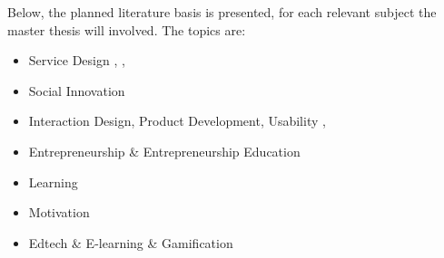 Below, the planned literature basis is presented, for each relevant subject the master thesis will involved. The topics are: \\

\begin{itemize}
	\item Service Design 
    \citep{servicedesign-ruth},
    \citep{servicedesign-balis},
    \citep{servicedesign-ruth}
    \citep{servicedesign-ideo}
    \citep{servicedesign-stickdorn}
    
    \item Social Innovation 	
    \citep{socialinnovation-ehn}

	\item Interaction Design, Product Development, Usability 
    \citep{interactiondesign-sierra-youtube}, 
    \citep{interactiondesign-badass}
    \citep{interactiondesign-lowgren}
    \citep{interactiondesign-beyer}
    
    \item Entrepreneurship \& Entrepreneurship Education
    \citep{entrepreneurship-pihkala}
    
    \item Learning %
    \citep{effectivelearning-robert}
    \citep{learning-krathwohl}
    \citep{learning-ucla}

	\item Motivation
    \citep{motivation-pink}
    
    \item Edtech \& E-learning \& Gamification
    \citep{edtech-clark} 
    \citep{edtech-sjoden} 
    \citep{edtech-dangelo}
\end{itemize}

%






